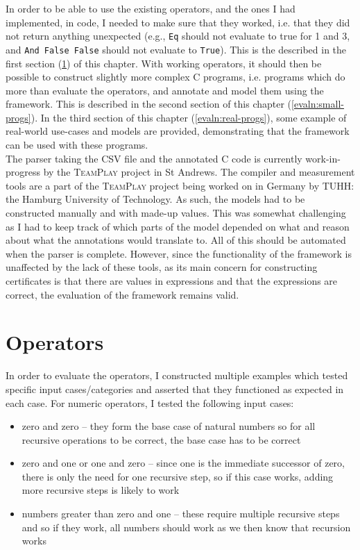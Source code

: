 In order to be able to use the existing operators, and the ones I had implemented, in code, I needed to make sure that they worked, i.e. that they did not return anything unexpected (e.g., \texttt{Eq} should not evaluate to true for 1 and 3, and \texttt{And False False} should not evaluate to \texttt{True}). This is the described in the first section (\ref{evaln:ops}) of this chapter. With working operators, it should then be possible to construct slightly more complex C programs, i.e. programs which do more than evaluate the operators, and annotate and model them using the framework. This is described in the second section of this chapter (\ref{evaln:small-progs}). In the third section of this chapter (\ref{evaln:real-progs}), some example of real-world use-cases and models are provided, demonstrating that the framework can be used with these programs.
\\

The parser taking the CSV file and the annotated C code is currently work-in-progress by the \textsc{TeamPlay} project in St Andrews. The compiler and measurement tools are a part of the \textsc{TeamPlay} project being worked on in Germany by TUHH: the Hamburg University of Technology. As such, the models had to be constructed manually and with made-up values. This was somewhat challenging as I had to keep track of which parts of the model depended on what and reason about what the annotations would translate to. All of this should be automated when the parser is complete. However, since the functionality of the framework is unaffected by the lack of these tools, as its main concern for constructing certificates is that there are values in expressions and that the expressions are correct, the evaluation of the framework remains valid.

\newpage


\section{Operators}\label{evaln:ops}
    In order to evaluate the operators, I constructed multiple examples which tested specific input cases/categories and asserted that they functioned as expected in each case. For numeric operators, I tested the following input cases:
    \begin{itemize}
        \item zero and zero -- they form the base case of natural numbers so for
              all recursive operations to be correct, the base case has to be correct
        \item zero and one or one and zero -- since one is the immediate
              successor of zero, there is only the need for one recursive step,
              so if this case works, adding more recursive steps is likely to 
              work
        \item numbers greater than zero and one -- these require multiple 
              recursive steps and so if they work, all numbers should work as
              we then know that recursion works
    \end{itemize}
    
